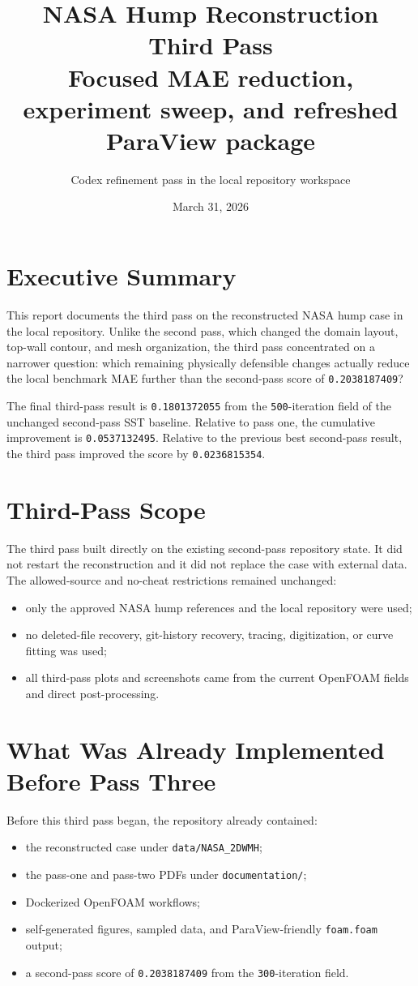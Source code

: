 \documentclass[11pt]{article}
\title{NASA Hump Reconstruction Third Pass\\\large Focused MAE reduction, experiment sweep, and refreshed ParaView package}
\author{Codex refinement pass in the local repository workspace}
\date{March 31, 2026}
\begin{document}
\setlength{\emergencystretch}{3em}
\maketitle

\section{Executive Summary}
This report documents the third pass on the reconstructed NASA hump case in the local repository. Unlike the second pass, which changed the domain layout, top-wall contour, and mesh organization, the third pass concentrated on a narrower question: which remaining physically defensible changes actually reduce the local benchmark MAE further than the second-pass score of \texttt{0.2038187409}?

The final third-pass result is \texttt{0.1801372055} from the \texttt{500}-iteration field of the unchanged second-pass SST baseline. Relative to pass one, the cumulative improvement is \texttt{0.0537132495}. Relative to the previous best second-pass result, the third pass improved the score by \texttt{0.0236815354}.

\section{Third-Pass Scope}
The third pass built directly on the existing second-pass repository state. It did not restart the reconstruction and it did not replace the case with external data. The allowed-source and no-cheat restrictions remained unchanged:
\begin{itemize}
\item only the approved NASA hump references and the local repository were used;
\item no deleted-file recovery, git-history recovery, tracing, digitization, or curve fitting was used;
\item all third-pass plots and screenshots came from the current OpenFOAM fields and direct post-processing.
\end{itemize}

\section{What Was Already Implemented Before Pass Three}
Before this third pass began, the repository already contained:
\begin{itemize}
\item the reconstructed case under \texttt{data/NASA\_2DWMH};
\item the pass-one and pass-two PDFs under \texttt{documentation/};
\item Dockerized OpenFOAM workflows;
\item self-generated figures, sampled data, and ParaView-friendly \texttt{foam.foam} output;
\item a second-pass score of \texttt{0.2038187409} from the \texttt{300}-iteration field.
\end{itemize}
\end{document}
